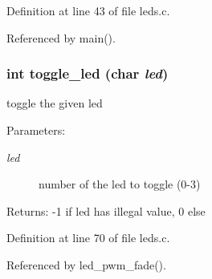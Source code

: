 Definition at line 43 of file leds.c.

Referenced by main().
\subsubsection{\setlength{\rightskip}{0pt plus 5cm}int toggle\_\-led (char {\em led})}\label{group__ro__leds_gefd2b64e1afc42f4660a408da854c6d4}


toggle the given led \begin{Desc}
\item[Parameters:]
\begin{description}
\item[{\em led}]number of the led to toggle (0-3) \end{description}
\end{Desc}
\begin{Desc}
\item[Returns:]-1 if led has illegal value, 0 else \end{Desc}


Definition at line 70 of file leds.c.

Referenced by led\_\-pwm\_\-fade().